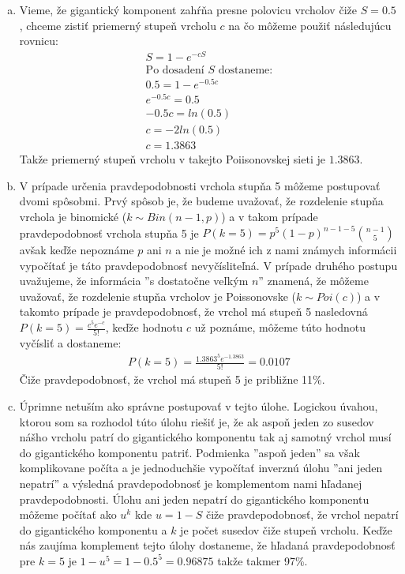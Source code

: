 \documentclass[a4paper]{article}
\begin{document}
\begin{enumerate}[(a)]
	\item 
	Vieme, že gigantický komponent zahŕňa presne polovicu vrcholov čiže $S=0.5$, chceme zistiť priemerný stupeň vrcholu $c$ na čo môžeme použiť následujúcu rovnicu:
	\begin{gather*}
		S = 1 - e^{-cS} \\
		\text{Po dosadení $S$ dostaneme:} \\
		0.5 = 1 - e^{-0.5c} \\
		e^{-0.5c} = 0.5 \\
		-0.5c = ln(0.5) \\
		c = -2ln(0.5) \\
		c = 1.3863
	\end{gather*}
	Takže priemerný stupeň vrcholu v takejto Poiisonovskej sieti je $1.3863$.
	
	\item 
	V prípade určenia pravdepodobnosti vrchola stupňa 5 môžeme postupovať dvomi spôsobmi. Prvý spôsob je, že budeme uvažovať, že rozdelenie stupňa vrchola je binomické ($k\sim Bin(n-1,p)$) a v takom prípade pravdepodobnosť vrchola stupňa 5 je $P(k=5) = p^5(1-p)^{n-1-5}\binom{n-1}{5}$ avšak keďže nepoznáme $p$ ani $n$ a nie je možné ich z nami známych informácii vypočítať je táto pravdepodobnosť nevyčísliteľná. V prípade druhého postupu uvažujeme, že informácia ''s dostatočne veľkým $n$'' znamená, že môžeme uvažovať, že rozdelenie stupňa vrcholov je Poissonovske ($k \sim Poi(c)$) a v takomto prípade je pravdepodobnosť, že vrchol má stupeň 5 nasledovná $P(k=5) = \frac{c^5e^{-c}}{5!}$, keďže hodnotu $c$ už poznáme, môžeme túto hodnotu vyčísliť a dostaneme:
	\begin{gather*}
		P(k=5) = \frac{1.3863^5e^{-1.3863}}{5!} = 0.0107
	\end{gather*}
	Čiže pravdepodobnosť, že vrchol má stupeň 5 je približne 11\%.
	
	\item 
	Úprimne netuším ako správne postupovať v tejto úlohe. Logickou úvahou, ktorou som sa rozhodol túto úlohu riešiť je, že ak aspoň jeden zo susedov nášho vrcholu patrí do gigantického komponentu tak aj samotný vrchol musí do gigantického komponentu patriť. Podmienka ''aspoň jeden'' sa však komplikovane počíta a je jednoduchšie vypočítať inverznú úlohu ''ani jeden nepatrí'' a výsledná pravdepodobnosť je komplementom nami hľadanej pravdepodobnosti. Úlohu ani jeden nepatrí do gigantického komponentu môžeme počítať ako $u^k$ kde $u=1-S$ čiže pravdepodobnosť, že vrchol nepatrí do gigantického komponentu a $k$ je počet susedov čiže stupeň vrcholu. Keďže nás zaujíma komplement tejto úlohy dostaneme, že hľadaná pravdepodobnosť pre $k=5$ je $1-u^5 = 1-0.5^5 = 0.96875$ takže takmer 97\%.
	

\end{enumerate}
\end{document}
